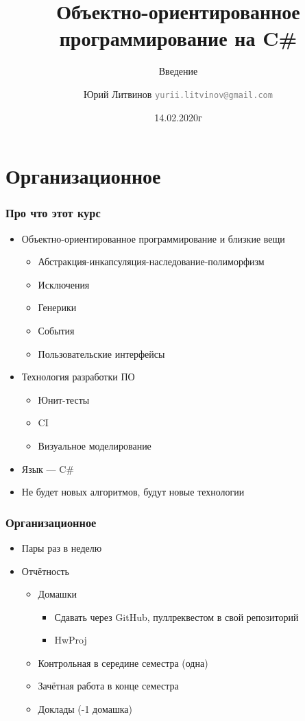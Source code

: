 \documentclass[xetex,mathserif,serif]{beamer}
\title{Объектно-ориентированное программирование на C\#}
\subtitle{Введение}
\author[Юрий Литвинов]{Юрий Литвинов \newline \textcolor{gray}{\small\texttt{yurii.litvinov@gmail.com}}}
\date{14.02.2020г}
\begin{document}
	
	\frame{\titlepage}

	\section{Организационное}

	\begin{frame}
		\frametitle{Про что этот курс}
		\begin{itemize}
			\item Объектно-ориентированное программирование и близкие вещи
			\begin{itemize}
				\item Абстракция-инкапсуляция-наследование-полиморфизм
				\item Исключения
				\item Генерики
				\item События
				\item Пользовательские интерфейсы
			\end{itemize}
			\item Технология разработки ПО
			\begin{itemize}
				\item Юнит-тесты
				\item CI
				\item Визуальное моделирование
			\end{itemize}
			\item Язык --- C\#
			\item Не будет новых алгоритмов, будут новые технологии
		\end{itemize}
	\end{frame}

	\begin{frame}
		\frametitle{Организационное}
		\begin{itemize}
			\item Пары раз в неделю
			\item Отчётность
			\begin{itemize}
				\item Домашки
				\begin{itemize}
					\item Сдавать через GitHub, пуллреквестом в свой репозиторий
					\item HwProj
				\end{itemize}
				\item Контрольная в середине семестра (одна)
				\item Зачётная работа в конце семестра
				\item Доклады (-1 домашка)
			\end{itemize}
		\end{itemize}
	\end{frame}
\end{document}
